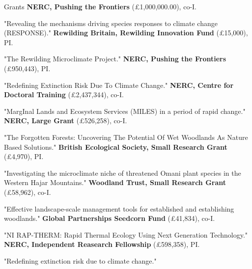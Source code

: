 \begin{rubric}{Grants}
\entry*[2024] \textbf{NERC, Pushing the Frontiers} (£1,000,000.00), co-I.
	\par \footnotesize "Revealing the mechanisms driving species responses to climate change (RESPONSE)." \normalsize
\entry*[2024] \textbf{Rewilding Britain, Rewilding Innovation Fund} (£15,000), PI.
	\par \footnotesize "The Rewilding Microclimate Project." \normalsize
\entry*[2023] \textbf{NERC, Pushing the Frontiers} (£950,443), PI.
	\par \footnotesize "Redefining Extinction Risk Due To Climate Change." \normalsize
\entry*[2023] \textbf{NERC, Centre for Doctoral Training} (£2,437,344), co-I.
	\par \footnotesize "MargInal Lands and Ecosystem Services (MILES) in a period of rapid change." \normalsize
\entry*[2023] \textbf{NERC, Large Grant} (£526,258), co-I.
	\par \footnotesize "The Forgotten Forests: Uncovering The Potential Of Wet Woodlands As Nature Based Solutions." \normalsize
\entry*[2022] \textbf{British Ecological Society, Small Research Grant} (£4,970), PI.
	\par \footnotesize "Investigating the microclimate niche of threatened Omani plant species in the Western Hajar Mountains." \normalsize
\entry*[2022] \textbf{Woodland Trust, Small Research Grant} (£58,962), co-I.
	\par \footnotesize "Effective landscape-scale management tools for established and establishing woodlands." \normalsize
\entry*[2022] \textbf{Global Partnerships Seedcorn Fund} (£41,834), co-I.
	\par \footnotesize "NI RAP-THERM: Rapid Thermal Ecology Using Next Generation Technology." \normalsize
\entry*[2020] \textbf{NERC, Independent Reasearch Fellowship} (£598,358), PI.
	\par \footnotesize "Redefining extinction risk due to climate change." \normalsize
\end{rubric}